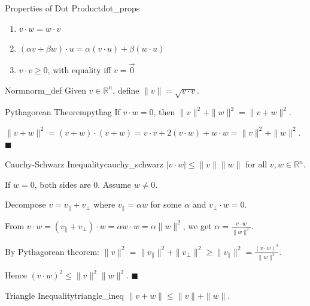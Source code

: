 \documentclass[11pt, letterpaper, openany]{book}
\renewenvironment{proof}[1][\proofname]{%
  \tcolorbox[blanker, breakable, left=1em,
    before skip=1em, after skip=1em,
    borderline west={2pt}{0pt}{MagicTeal!50},
    colback=MagicCream,
    before upper={\textcolor{MagicTeal}{\sffamily\bfseries #1.}\space}
  ]%
}{%
  \hfill\textcolor{MagicTeal}{\ensuremath{\blacksquare}}\endtcolorbox%
}
\begin{document}
\begin{thm}{Properties of Dot Product}{dot_props}
\begin{enumerate}
    \item $v \cdot w = w \cdot v$
    \item $(\alpha v + \beta w) \cdot u = \alpha(v \cdot u) + \beta(w \cdot u)$
    \item $v \cdot v \geq 0$, with equality iff $v = \vec{0}$
\end{enumerate}
\end{thm}

\begin{defn}{Norm}{norm_def}
Given $v \in \mathbb{R}^n$, define $\|v\| = \sqrt{v \cdot v}$.
\end{defn}

\begin{thm}{Pythagorean Theorem}{pythag}
If $v \cdot w = 0$, then $\|v\|^2 + \|w\|^2 = \|v + w\|^2$.
\end{thm}

\begin{proof}
$\|v + w\|^2 = (v + w) \cdot (v + w) = v \cdot v + 2(v \cdot w) + w \cdot w = \|v\|^2 + \|w\|^2$.
\end{proof}

\begin{thm}{Cauchy-Schwarz Inequality}{cauchy_schwarz}
$|v \cdot w| \leq \|v\| \|w\|$ for all $v, w \in \mathbb{R}^n$.
\end{thm}

\begin{proof}
If $w = 0$, both sides are 0. Assume $w \neq 0$.

Decompose $v = v_\parallel + v_\perp$ where $v_\parallel = \alpha w$ for some $\alpha$ and $v_\perp \cdot w = 0$.

From $v \cdot w = (v_\parallel + v_\perp) \cdot w = \alpha w \cdot w = \alpha \|w\|^2$, we get $\alpha = \frac{v \cdot w}{\|w\|^2}$.

By Pythagorean theorem: $\|v\|^2 = \|v_\parallel\|^2 + \|v_\perp\|^2 \geq \|v_\parallel\|^2 = \frac{(v \cdot w)^2}{\|w\|^2}$.

Hence $(v \cdot w)^2 \leq \|v\|^2 \|w\|^2$.
\end{proof}

\begin{thm}{Triangle Inequality}{triangle_ineq}
$\|v + w\| \leq \|v\| + \|w\|$.
\end{thm}
\end{document}
